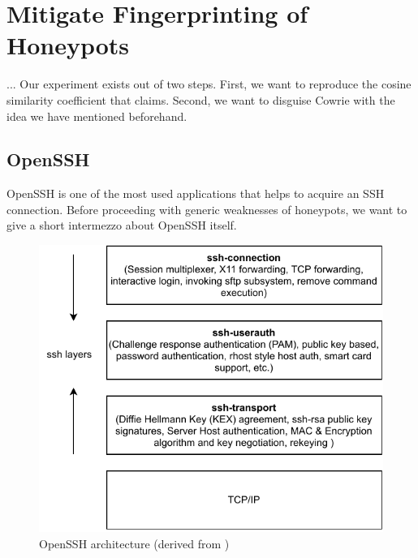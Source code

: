 \chapter{Mitigate Fingerprinting of Honeypots}
\label{chap:fingerprinting}

... %
Our experiment exists out of two steps.
First, we want to reproduce the cosine similarity coefficient that \citet{vetterl2020} claims.
Second, we want to disguise Cowrie with the idea we have mentioned beforehand.

\section{OpenSSH}
\label{sec:openssh}

OpenSSH is one of the most used applications that helps to acquire an SSH connection.
Before proceeding with generic weaknesses of honeypots, we want to give a short intermezzo about OpenSSH itself.

\begin{figure}
    \centering
    \includegraphics{figures/openssh-architecture.pdf}
    \caption[OpenSSH architecture]{OpenSSH architecture (derived from \cite{openssh2007})}
    \label{fig:openssh-architecture}
\end{figure}

